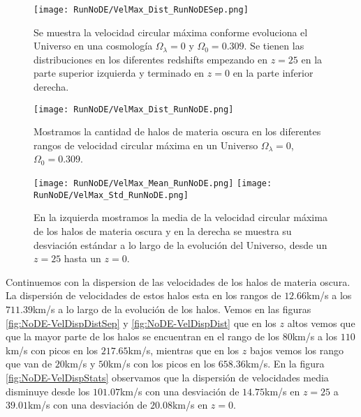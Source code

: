 \begin{figure}[H]
    \centering
    \texttt{[image: RunNoDE/VelMax\_Dist\_RunNoDESep.png]}
    \caption[Velocidad circular máxima]{\footnotesize Se muestra la velocidad circular máxima conforme evoluciona el Universo en una cosmología $\Omega_\lambda = 0$ y $\Omega_0 = 0.309$. Se tienen las distribuciones en los diferentes redshifts empezando en $z=25$ en la parte superior izquierda y terminado en $z=0$ en la parte inferior derecha.}
    \label{fig:NoDE-VelMaxDistSep}
\end{figure}

\begin{figure}[H]
    \centering
    \texttt{[image: RunNoDE/VelMax\_Dist\_RunNoDE.png]}
    \caption[Distribución de la velocidad circular máxima]{\footnotesize Mostramos la cantidad de halos de materia oscura en los diferentes rangos de velocidad circular máxima en un Universo $\Omega_\lambda = 0$, $\Omega_0 = 0.309$.}
    \label{fig:NoDE-VelMaxDist}
\end{figure}

\begin{figure}[H]
    \centering
    \texttt{[image: RunNoDE/VelMax\_Mean\_RunNoDE.png]}
    \texttt{[image: RunNoDE/VelMax\_Std\_RunNoDE.png]}
    \caption[Media y desviación estándar de la velocidad circular máxima]{\footnotesize En la izquierda mostramos la media de la velocidad circular máxima de los halos de materia oscura y en la derecha se muestra su desviación estándar a lo largo de la evolución del Universo, desde un $z=25$ hasta un $z=0$.}
    \label{fig:NoDE-VelMaxStats}
\end{figure}

Continuemos con la dispersion de las velocidades de los halos de materia oscura. La dispersión de velocidades de estos halos esta en los rangos de $12.66$km/s a los $711.39$km/s a lo largo de la evolución de los halos. Vemos en las figuras \ref{fig:NoDE-VelDispDistSep} y \ref{fig:NoDE-VelDispDist} que en los $z$ altos vemos que que la mayor parte de los halos se encuentran en el rango de los $80$km/s a los $110$km/s con picos en los $217.65$km/s, mientras que en los $z$ bajos vemos los rango que van de $20$km/s y $50$km/s con los picos en los $658.36$km/s. En la figura \ref{fig:NoDE-VelDispStats} observamos que la dispersión de velocidades media disminuye desde los $101.07$km/s con una desviación de $14.75$km/s en $z=25$ a $39.01$km/s con una desviación de $20.08$km/s en $z=0$.

